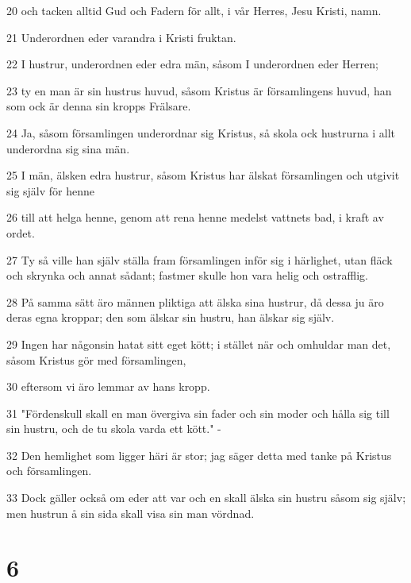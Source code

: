 \par 20 och tacken alltid Gud och Fadern för allt, i vår Herres, Jesu Kristi, namn.
\par 21 Underordnen eder varandra i Kristi fruktan.
\par 22 I hustrur, underordnen eder edra män, såsom I underordnen eder Herren;
\par 23 ty en man är sin hustrus huvud, såsom Kristus är församlingens huvud, han som ock är denna sin kropps Frälsare.
\par 24 Ja, såsom församlingen underordnar sig Kristus, så skola ock hustrurna i allt underordna sig sina män.
\par 25 I män, älsken edra hustrur, såsom Kristus har älskat församlingen och utgivit sig själv för henne
\par 26 till att helga henne, genom att rena henne medelst vattnets bad, i kraft av ordet.
\par 27 Ty så ville han själv ställa fram församlingen inför sig i härlighet, utan fläck och skrynka och annat sådant; fastmer skulle hon vara helig och ostrafflig.
\par 28 På samma sätt äro männen pliktiga att älska sina hustrur, då dessa ju äro deras egna kroppar; den som älskar sin hustru, han älskar sig själv.
\par 29 Ingen har någonsin hatat sitt eget kött; i stället när och omhuldar man det, såsom Kristus gör med församlingen,
\par 30 eftersom vi äro lemmar av hans kropp.
\par 31 "Fördenskull skall en man övergiva sin fader och sin moder och hålla sig till sin hustru, och de tu skola varda ett kött." -
\par 32 Den hemlighet som ligger häri är stor; jag säger detta med tanke på Kristus och församlingen.
\par 33 Dock gäller också om eder att var och en skall älska sin hustru såsom sig själv; men hustrun å sin sida skall visa sin man vördnad.

\chapter{6}

